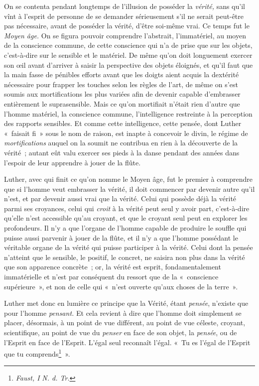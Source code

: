 \documentclass[french,twoside]{book} %
\begin{document}
\noindent On se contenta pendant longtemps de l’illusion de posséder la \emph{vérité,} sans qu’il vînt à l’esprit de personne de se demander sérieusement s’il ne serait peut-être pas nécessaire, avant de posséder la vérité, d’être soi-même vrai. Ce temps fut le \emph{Moyen âge.} On se figura pouvoir comprendre l’abstrait, l’immatériel, au moyen de la conscience commune, de cette conscience qui n’a de prise que sur les objets, c’est-à-dire sur le sensible et le matériel. De même qu’on doit longuement exercer son œil avant d’arriver à saisir la perspective des objets éloignés, et qu’il faut que la main fasse de pénibles efforts avant que les doigts aient acquis la dextérité nécessaire pour frapper les touches selon les règles de l’art, de même on s’est soumis aux mortifications les plus variées afin de devenir capable d’embrasser entièrement le suprasensible. Mais ce qu’on mortifiait n’était rien d’autre que l’homme matériel, la conscience commune, l’intelligence restreinte à la perception des rapports sensibles. Et comme cette intelligence, cette pensée, dont Luther « faisait fi » sous le nom de raison, est inapte à concevoir le divin, le régime de \emph{mortifications} auquel on la soumit ne contribua en rien à la découverte de la vérité ; autant eût valu exercer ses pieds à la danse pendant des années dans l’espoir de leur apprendre à jouer de la flûte.\par
Luther, avec qui finit ce qu’on nomme le Moyen âge, fut le premier à comprendre que si l’homme veut embrasser la vérité, il doit commencer par devenir autre qu’il n’est, et par devenir aussi vrai que la vérité. Celui qui possède déjà la vérité parmi ses croyances, celui qui \emph{croit} à la vérité peut seul y avoir part, c’est-à-dire qu’elle n’est accessible qu’au croyant,  et que le croyant seul peut en explorer les profondeurs. Il n’y a que l’organe de l’homme capable de produire le souffle qui puisse aussi parvenir à jouer de la flûte, et il n’y a que l’homme possédant le véritable organe de la vérité qui puisse participer à la vérité. Celui dont la pensée n’atteint que le sensible, le positif, le concret, ne saisira non plus dans la vérité que son apparence concrète ; or, la vérité est esprit, fondamentalement immatérielle et n’est par conséquent du ressort que de la « conscience supérieure », et non de celle qui « n’est ouverte qu’aux choses de la terre ».\par
Luther met donc en lumière ce principe que la Vérité, étant \emph{pensée}, n’existe que pour l’homme \emph{pensant. }Et cela revient à dire que l’homme doit simplement se placer, désormais, à un point de vue différent, au point de vue céleste, croyant, scientifique, au point de vue du \emph{penser} en face de son objet, la \emph{pensée}, ou de l’Esprit en face de l’Esprit. L’égal seul reconnaît l’égal. « Tu es l’égal de l’Esprit que tu comprends\footnote{ \noindent \emph{Faust, I} \emph{N. d. Tr.}
 } ».\par
\end{document}

